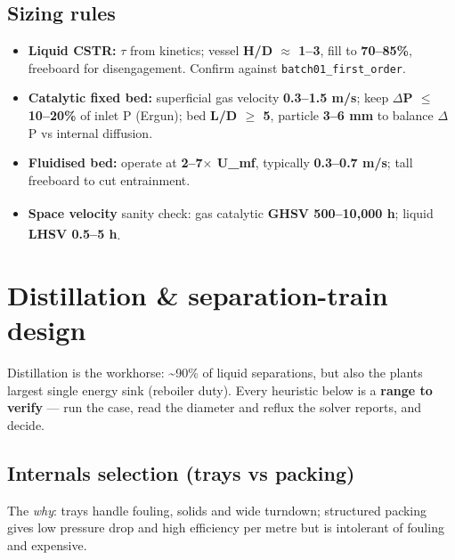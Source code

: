 \documentclass[11pt,a4paper]{article}
\providecommand{\tightlist}{\setlength{\itemsep}{0pt}\setlength{\parskip}{0pt}}
\begin{document}
\hypertarget{sizing-rules}{%
\subsection{Sizing rules}\label{sizing-rules}}

\begin{itemize}
\tightlist
\item
  \textbf{Liquid CSTR:} \(\tau\) from kinetics; vessel \textbf{H/D \(\approx\) 1--3},
  fill to \textbf{70--85\%}, freeboard for disengagement. Confirm
  against \texttt{batch01\_first\_order}.
\item
  \textbf{Catalytic fixed bed:} superficial gas velocity
  \textbf{0.3--1.5 m/s}; keep \textbf{\(\Delta\)P \(\le\) 10--20\%} of inlet P (Ergun);
  bed \textbf{L/D \(\ge\) 5}, particle \textbf{3--6 mm} to balance \(\Delta\)P vs
  internal diffusion.
\item
  \textbf{Fluidised bed:} operate at \textbf{2--7\(\times\) U\_mf}, typically
  \textbf{0.3--0.7 m/s}; tall freeboard to cut entrainment.
\item
  \textbf{Space velocity} sanity check: gas catalytic \textbf{GHSV
  500--10,000 h\textsuperscript{}}; liquid \textbf{LHSV 0.5--5 h\textsuperscript{}}.
\end{itemize}

\hypertarget{distillation--separation-train-design}{%
\section{Distillation \& separation-train
design}\label{distillation--separation-train-design}}

Distillation is the workhorse: \textasciitilde90\% of liquid
separations, but also the plant\textquotesingle s largest single energy
sink (reboiler duty). Every heuristic below is a \textbf{range to
verify} --- run the case, read the diameter and reflux the solver
reports, and decide.

\hypertarget{internals-selection-trays-vs-packing}{%
\subsection{Internals selection (trays vs
packing)}\label{internals-selection-trays-vs-packing}}

The \emph{why}: trays handle fouling, solids and wide turndown;
structured packing gives low pressure drop and high efficiency per metre
but is intolerant of fouling and expensive.
\end{document}
